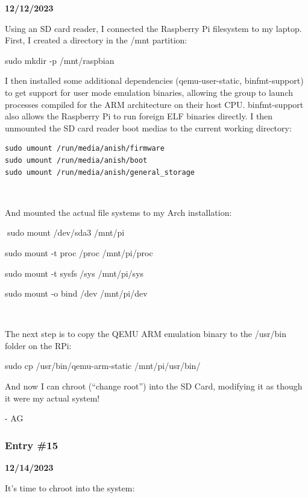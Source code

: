 \textbf{12/12/2023}

Using an SD card reader, I connected the Raspberry Pi filesystem to my
laptop. First, I created a directory in the /mnt partition:

sudo mkdir -p /mnt/raspbian

I then installed some additional dependencies (qemu-user-static,
binfmt-support) to get support for user mode emulation binaries,
allowing the group to launch processes compiled for the ARM architecture
on their host CPU. binfmt-support also allows the Raspberry Pi to run
foreign ELF binaries directly. I then unmounted the SD card reader boot
medias to the current working directory:

\begin{verbatim}
sudo umount /run/media/anish/firmware
sudo umount /run/media/anish/boot
sudo umount /run/media/anish/general_storage
\end{verbatim}





And mounted the actual file systems to my Arch installation:

sudo mount /dev/sda3 /mnt/pi

sudo mount -t proc /proc /mnt/pi/proc

sudo mount -t sysfs /sys /mnt/pi/sys

sudo mount -o bind /dev /mnt/pi/dev



The next step is to copy the QEMU ARM emulation binary to the /usr/bin
folder on the RPi:

sudo cp /usr/bin/qemu-arm-static /mnt/pi/usr/bin/

And now I can chroot (``change root'') into the SD Card, modifying it as
though it were my actual system!

- AG

\subsubsection{\texorpdfstring{\hfill\break
}{ }}\label{section-11}

\subsubsection{Entry \#15}\label{entry-15}

\textbf{12/14/2023}

It's time to chroot into the system:

